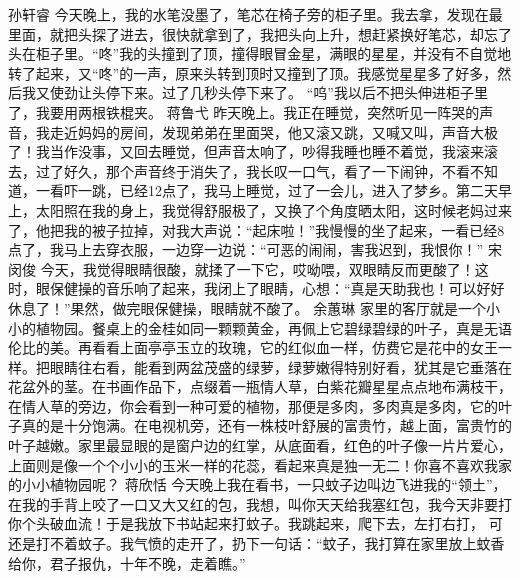 {}\markdownRendererInterblockSeparator
{}孙轩睿\markdownRendererInterblockSeparator
{}今天晚上，我的水笔没墨了，笔芯在椅子旁的柜子里。我去拿，发现在最里面，就把头探了进去，很快就拿到了，我把头向上升，想赶紧换好笔芯，却忘了头在柜子里。“咚”我的头撞到了顶，撞得眼冒金星，满眼的星星，并没有不自觉地转了起来，又“咚”的一声，原来头转到顶时又撞到了顶。我感觉星星多了好多，然后我又使劲让头停下来。过了几秒头停下来了。 “呜”我以后不把头伸进柜子里了，我要用两根铁棍夹。\markdownRendererInterblockSeparator
{}\markdownRendererInterblockSeparator
{}蒋鲁弋\markdownRendererInterblockSeparator
{}昨天晚上。我正在睡觉，突然听见一阵哭的声音，我走近妈妈的房间，发现弟弟在里面哭，他又滚又跳，又喊又叫，声音大极了！我当作没事，又回去睡觉，但声音太响了，吵得我睡也睡不着觉，我滚来滚去，过了好久，那个声音终于消失了，我长叹一口气，看了一下闹钟，不看不知道，一看吓一跳，已经12点了，我马上睡觉，过了一会儿，进入了梦乡。第二天早上，太阳照在我的身上，我觉得舒服极了，又换了个角度晒太阳，这时候老妈过来了，他把我的被子拉掉，对我大声说：“起床啦！”我慢慢的坐了起来，一看已经8点了，我马上去穿衣服，一边穿一边说：“可恶的闹闹，害我迟到，我恨你！”\markdownRendererInterblockSeparator
{}\markdownRendererInterblockSeparator
{}宋闵俊\markdownRendererInterblockSeparator
{}今天，我觉得眼睛很酸，就揉了一下它，哎呦喂，双眼睛反而更酸了！这时，眼保健操的音乐响了起来，我闭上了眼睛，心想：“真是天助我也！可以好好休息了！”果然，做完眼保健操，眼睛就不酸了。\markdownRendererInterblockSeparator
{}\markdownRendererInterblockSeparator
{}余蕙琳\markdownRendererInterblockSeparator
{}家里的客厅就是一个小小的植物园。餐桌上的金桂如同一颗颗黄金，再佩上它碧绿碧绿的叶子，真是无语伦比的美。再看看上面亭亭玉立的玫瑰，它的红似血一样，仿费它是花中的女王一样。把眼睛往右看，能看到两盆茂盛的绿萝，绿萝嫩得特别好看，犹其是它垂落在花盆外的茎。在书画作品下，点缀着一瓶情人草，白紫花瓣星星点点地布满枝干，在情人草的旁边，你会看到一种可爱的植物，那便是多肉，多肉真是多肉，它的叶子真的是十分饱满。在电视机旁，还有一株枝叶舒展的富贵竹，越上面，富贵竹的叶子越嫩。家里最显眼的是窗户边的红掌，从底面看，红色的叶子像一片片爱心，上面则是像一个个小小的玉米一样的花蕊，看起来真是独一无二！你喜不喜欢我家的小小植物园呢？\markdownRendererInterblockSeparator
{}\markdownRendererInterblockSeparator
{}蒋欣恬\markdownRendererInterblockSeparator
{}今天晚上我在看书，一只蚊子边叫边飞进我的“领土”，在我的手背上咬了一口又大又红的包，我想，叫你天天给我塞红包，我今天非要打你个头破血流！于是我放下书站起来打蚊子。我跳起来，爬下去，左打右打， 可还是打不着蚊子。我气愤的走开了，扔下一句话：“蚊子，我打算在家里放上蚊香给你，君子报仇，十年不晚，走着瞧。”\markdownRendererInterblockSeparator

